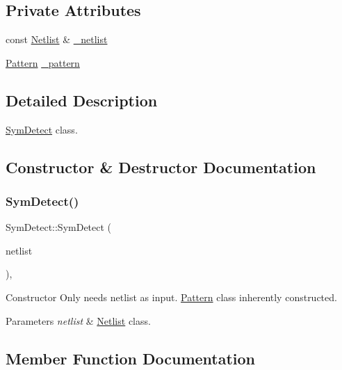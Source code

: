\subsection*{Private Attributes}
\begin{DoxyCompactItemize}
\item 
const \hyperlink{classNetlist}{Netlist} \& \hyperlink{classSymDetect_aaa007c5c446ad65879c91e258542c9f3}{\+\_\+netlist}
\item 
\hyperlink{classPattern}{Pattern} \hyperlink{classSymDetect_a77937a3591871874553ea30e7d78fc2e}{\+\_\+pattern}
\end{DoxyCompactItemize}


\subsection{Detailed Description}
\hyperlink{classSymDetect}{Sym\+Detect} class. 

\subsection{Constructor \& Destructor Documentation}
\mbox{\label{classSymDetect_aaf0ca6563b2168db22cfd313ec773c23}} 
\subsubsection{\texorpdfstring{Sym\+Detect()}{SymDetect()}}
{\footnotesize\ttfamily Sym\+Detect\+::\+Sym\+Detect (\begin{DoxyParamCaption}\item[{const \hyperlink{classNetlist}{Netlist} \&}]{netlist }\end{DoxyParamCaption})\hspace{0.3cm}{\ttfamily [inline]}, {\ttfamily [explicit]}}



Constructor Only needs netlist as input. \hyperlink{classPattern}{Pattern} class inherently constructed. 


\begin{DoxyParams}{Parameters}
{\em netlist} & \hyperlink{classNetlist}{Netlist} class. \\
\hline
\end{DoxyParams}


\subsection{Member Function Documentation}
\mbox{\label{classSymDetect_acd33a2c834493240fc4e8840819d676c}} 
